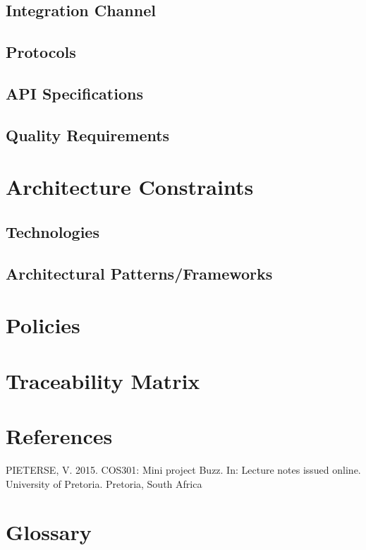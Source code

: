 \documentclass[a4paper]{article}
\begin{document}
\subsection{Integration Channel}
\subsection{Protocols}
\subsection{API Specifications}
\subsection{Quality Requirements}

\section{Architecture Constraints}
\subsection{Technologies}
\subsection{Architectural Patterns/Frameworks}

\section{Policies}

\section{Traceability Matrix}

\section{References}
PIETERSE, V. 2015. COS301: Mini project Buzz. In: Lecture notes issued online. University of Pretoria. Pretoria, South Africa

\section{Glossary}
\end{document}
